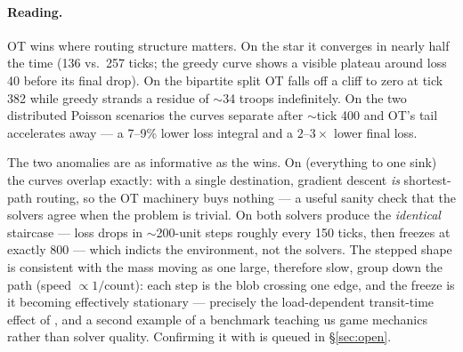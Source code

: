 \begin{table}[htbp]
\centering
{}
\caption{Ticks to converge (``--'' = never within 800 ticks) and loss
integral. Lower is better.}
\label{tab:transport}
\end{table}

\paragraph{Reading.} OT wins where routing structure matters. On the star it
converges in nearly half the time (136 vs.\ 257 ticks; the greedy curve
shows a visible plateau around loss 40 before its final drop). On the
bipartite split OT falls off a cliff to zero at tick 382 while greedy
strands a residue of $\sim$34 troops indefinitely. On the two distributed
Poisson scenarios the curves separate after $\sim$tick 400 and OT's tail
accelerates away --- a 7--9\% lower loss integral and a $2$--$3\times$ lower
final loss.

The two anomalies are as informative as the wins. On 
(everything to one sink) the curves overlap exactly: with a single
destination, gradient descent \emph{is} shortest-path routing, so the OT
machinery buys nothing --- a useful sanity check that the solvers agree when
the problem is trivial. On  both solvers produce the
\emph{identical} staircase --- loss drops in $\sim$200-unit steps roughly
every 150 ticks, then freezes at exactly 800 --- which indicts the
environment, not the solvers. The stepped shape is consistent with the mass
moving as one large, therefore slow, group down the path (speed
$\propto 1/\text{count}$): each step is the blob crossing one edge, and the
freeze is it becoming effectively stationary --- precisely the
load-dependent transit-time effect of \citet{koehler2002}, and a second
example of a benchmark teaching us game mechanics rather than solver
quality. Confirming it with  is queued in
\S\ref{sec:open}.
